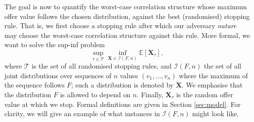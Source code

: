 \documentclass[11pt,a4paper]{article}
\numberwithin{equation}{section}
\begin{document}
The goal is now to quantify the worst-case correlation structure whose maximum offer value follows the chosen distribution, against the best (randomised) stopping rule. That is, we first choose a stopping rule after which our adversary \textit{nature} may choose the worst-case correlation structure against this rule. More formal, we want to solve the sup-inf problem
$$
\sup_{\tau\in\mathcal{T}} \inf_{\boldsymbol{X}\in\mathcal{I}(F, n)} \mathbb{E}[\boldsymbol{X}_{\tau}],
$$
where $\mathcal{T}$ is the set of all randomised stopping rules, and $\mathcal{I}(F,n)$ the set of all joint distributions over sequences of $n$ values $(v_1,\dots,v_n)$ where the maximum of the sequence follows $F$; such a distribution is denoted by $\mathbf{X}$. We emphasise that the distribution $F$ is allowed to depend on $n$. Finally, $\mathbf{X}_{\tau}$ is the random offer value at which we stop. Formal definitions are given in Section \ref{sec:model}. For clarity, we will give an example of what instances in $\mathcal{I}(F, n)$ might look like.
\end{document}
